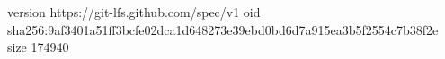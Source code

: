 version https://git-lfs.github.com/spec/v1
oid sha256:9af3401a51ff3bcfe02dca1d648273e39ebd0bd6d7a915ea3b5f2554c7b38f2e
size 174940
